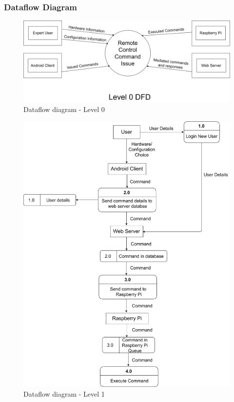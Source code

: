 \documentclass[12pt, oneside, a4paper]{book}
\begin{document}
			
				\newpage\subsubsection{Dataflow Diagram}
				\begin{figure}[H]
					\includegraphics[width=\linewidth]{img/diagram_dataflow_lvl0.png}
					\caption{Dataflow diagram - Level 0}
				\end{figure}
				\begin{figure}[H]
					\includegraphics[width=\linewidth]{img/diagram_dataflow_lvl1.png}
					\caption{Dataflow diagram - Level 1}
				\end{figure}
\end{document}
